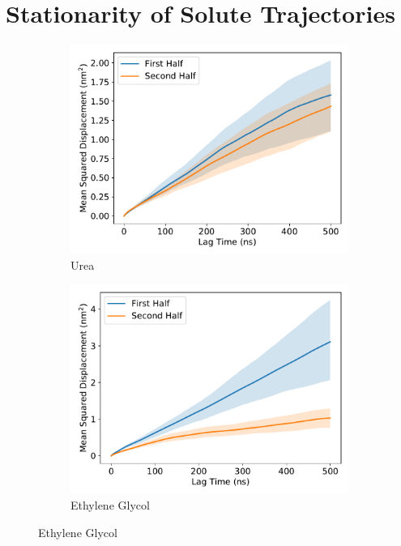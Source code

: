 \documentclass{article}
\begin{document}
  \section{Stationarity of Solute Trajectories}\label{section:msd_comparison}
  
  \begin{figure}
  \centering
  \begin{subfigure}{0.45\textwidth}
  \includegraphics[width=\textwidth]{URE_MSD_halves.pdf}
  \caption{Urea}\label{fig:URE_MSD_halves}
  \end{subfigure}
  \begin{subfigure}{0.45\textwidth}
  \includegraphics[width=\textwidth]{GCL_MSD_halves.pdf}
  \caption{Ethylene Glycol}\label{fig:GCL_MSD_halves}

\end{subfigure}
\end{figure}
\end{document}
